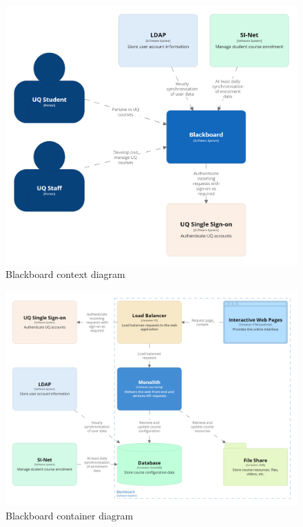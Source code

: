 \documentclass{csse4400}
\begin{document}
\begin{figure}[h!]
\centering
\includegraphics[width=\textwidth]{images/context}
\caption{Blackboard context diagram}
\end{figure}
\vspace{2em}

\begin{figure}
\centering
\includegraphics[width=\textwidth]{images/container}
\caption{Blackboard container diagram}
\end{figure}
\end{document}
